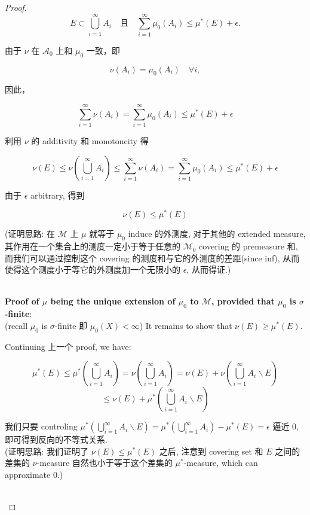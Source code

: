 \documentclass{qlnotes-export}
\begin{document}
\begin{proof}
\[E \subset \bigcup\limits_{i = 1}^{\infty}A_{i}\quad\text{且}\quad\sum\limits_{i = 1}^{\infty}\mu_{0}(A_{i}) \leq \mu^{\ast}(E) + \epsilon.\]

由于 \(\nu\) 在 \(\mathcal{A}_{0}\) 上和 \(\mu_{0}\) 一致，即

\[\nu(A_{i}) = \mu_{0}(A_{i})\quad\forall i,\]

因此，

\[\sum\limits_{i = 1}^{\infty}\nu(A_{i}) = \sum\limits_{i = 1}^{\infty}\mu_{0}(A_{i}) \leq \mu^{\ast}(E) + \epsilon\]

利用 \(\nu\) 的 additivity 和 monotoncity 得

\[\nu(E) \leq \nu(\bigcup\limits_{i = 1}^{\infty}A_{i}) \leq \sum\limits_{i = 1}^{\infty}\nu(A_{i}) = \sum\limits_{i = 1}^{\infty}\mu_{0}(A_{i}) \leq \mu^{\ast}(E) + \epsilon\]

由于 \(\epsilon\) arbitrary, 得到

\[\nu(E) \leq \mu^{\ast}(E)\]

(证明思路: 在 \(\mathcal{M}\) 上 \(\mu\) 就等于 \(\mu_{0}\) induce 的外测度, 对于其他的 extended measure, 其作用在一个集合上的测度一定小于等于任意的 \(\mathcal{M}_{0}\) covering 的 premeasure 和, 而我们可以通过控制这个 covering 的测度和与它的外测度的差距(since inf), 从而使得这个测度小于等它的外测度加一个无限小的 \(\epsilon\), 从而得证.)\\
\strut \\
\textbf{Proof of \(\mu\) being the unique extension of \(\mu_{0}\) to \(\mathcal{M}\), provided that \(\mu_{0}\) is \(\sigma\)-finite}:\\
(recall \(\mu_{0}\) is \(\sigma\)-finite 即 \(\mu_{0}(X) < \infty\)) It remains to show that \(\nu(E) \geq \mu^{\ast}(E)\).

Continuing 上一个 proof, we have:

\[\mu^{\ast}(E) \leq \mu^{\ast}(\bigcup\limits_{i = 1}^{\infty}A_{i}) = \nu(\bigcup\limits_{i = 1}^{\infty}A_{i}) = \nu(E) + \nu(\bigcup\limits_{i = 1}^{\infty}A_{i}\backslash E)\]\[\leq \nu(E) + \mu^{\ast}(\bigcup\limits_{i = 1}^{\infty}A_{i}\backslash E)\]

我们只要 controling \(\mu^{\ast}(\bigcup_{i = 1}^{\infty}A_{i}\backslash E) = \mu^{\ast}(\bigcup_{i = 1}^{\infty}A_{i}) - \mu^{\ast}(E) = \epsilon\) 逼近 0, 即可得到反向的不等式关系.\\
(证明思路: 我们证明了 \(\nu(E) \leq \mu^{\ast}(E)\) 之后, 注意到 covering set 和 \(E\) 之间的差集的 \(\nu\)-measure 自然也小于等于这个差集的 \(\mu^{\ast}\)-measure, which can approximate 0.)\\
\strut \\

\end{proof}
\end{document}
